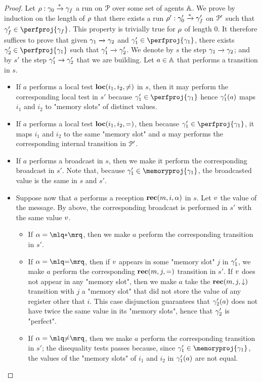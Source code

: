 \begin{proof}
	Let $\rho: \gamma_0 \xrightarrow{*} \gamma_f$ a run on $\mathcal{P}$ over some set of agents $\mathbb{A}$. We prove by induction on the length of $\rho$ that there exists a run $\rho': \gamma_0' \xrightarrow{*} \gamma_f'$ on $\mathcal{P}'$ such that $\config_f' \in \perfproj{\config_f}$. This property is trivially true for $\rho$ of length $0$. It therefore suffices to prove that given $\gamma_1 \xrightarrow{} \gamma_2$ and $\config_1' \in \perfproj{\config_1}$, there exists $\config_2' \in \perfproj{\config_1}$ such that $\gamma_1' \xrightarrow{} \gamma_2'$. We denote by $s$ the step $\gamma_1 \xrightarrow{} \gamma_2$; and by $s'$ the step $\gamma'_1 \xrightarrow{} \gamma'_2$ that we are building. 
	Let $a \in \mathbb{A}$ that performs a transition in $s$.
	\begin{itemize}
	\item If $a$ performs a local test $\textbf{loc}(i_1,i_2,{\ne})$ in $s$, then it may perform the corresponding local test in $s'$ because $\config_1' \in \perfproj{\config_1}$ hence $\gamma_1'(a)$ maps $i_1$ and $i_2$ to "memory slots" of distinct values. 
	\item If $a$ performs a local test  $\textbf{loc}(i_1,i_2,{=})$, then because $\config_1'\in \perfproj{\config_1}$, it maps $i_1$ and $i_2$ to the same "memory slot" and $a$ may performs the corresponding internal transition in $\mathcal{P}'$.  
	\item If $a$ performs a broadcast in $s$, then we make it perform the corresponding broadcast in $s'$. Note that, because $\config_1' \in \memoryproj{\config_1}$, the broadcasted value is the same in $s$ and $s'$. 
	\item 
	Suppose now that $a$ performs a reception $\textbf{rec}(m, i, \alpha)$ in $s$. Let $v$ the value of the message. By above, the corresponding broadcast is performed in $s'$ with the same value $v$. 
		\begin{itemize}
		\item If $\anact = \quotemarks{\dummyact}$, then we make $a$ perform the corresponding transition in $s'$. 
		\item If $\anact = \quotemarks{\eqtestact}$, then if $v$ appears in some "memory slot" $j$ in $\gamma_1'$, we make $a$ perform the corresponding $\textbf{rec}(m, j, {=})$ transition in $s'$. 
		If $v$ does not appear in any "memory slot", then we make $a$ take the $\textbf{rec}(m, j, \downarrow)$ transition with $j$ a "memory slot" that did not store the value of any register other that $i$. This case disjunction guarantees that $\gamma_2'(a)$ does not have twice the same value in its "memory slots", hence that $\gamma_2'$ is "perfect".
		\item If $\anact = \quotemarks{\diseqtestact}$, then we make $a$ perform the corresponding transition in $s'$; the disequality tests passes because, since $\config_1' \in \memoryproj{\config_1}$, the values of the "memory slots" of $i_1$ and $i_2$ in $\gamma_1'(a)$ are not equal.
		\end{itemize}
	\end{itemize}


\end{proof}
